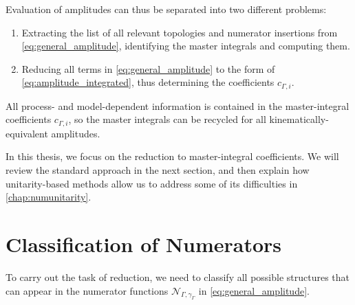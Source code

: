 Evaluation of amplitudes can thus be separated into two different problems:
\begin{enumerate}
  \item Extracting  the list of all relevant topologies and numerator insertions from \cref{eq:general_amplitude},
    identifying the master integrals and computing them.
  \item Reducing all terms in \cref{eq:general_amplitude} to the form of \cref{eq:amplitude_integrated}, thus
    determining the coefficients $c_{\Gamma,i}$.
\end{enumerate}
All process- and model-dependent information is contained in the master-integral coefficients $c_{\Gamma,i}$,
so the master integrals can be recycled for all kinematically-equivalent amplitudes.

In this thesis, we focus on the reduction to master-integral coefficients.
We will review the standard approach in the next section, and
then explain how unitarity-based methods allow us to address some of its difficulties in \cref{chap:numunitarity}.

\section{Classification of Numerators}
\label{sec:classification_numerators}

To carry out the task of reduction,
we need to classify all possible structures that can appear in the numerator functions $\mathcal{N}_{\Gamma,\gamma_\Gamma}$ in \cref{eq:general_amplitude}.

